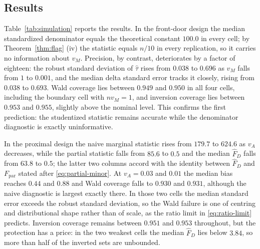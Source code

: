 \documentclass[12pt,a4paper]{article}
\theoremstyle{plain}
\theoremstyle{definition}
\newcommand{\FD}{\widehat{F}_D}
\begin{document}
\subsection{Results}

Table~\ref{tab:simulation} reports the results.
In the front-door design the median standardized denominator equals the theoretical constant $100.0$ in every cell;
by Theorem~\ref{thm:flag} (iv) the statistic equals $n/10$ in every replication, so it carries no information about $v_M$.
Precision, by contrast, deteriorates by a factor of eighteen:
the robust standard deviation of $\hat\tau$ rises from $0.038$ to $0.696$ as $v_M$ falls from $1$ to $0.001$, and the median delta standard error tracks it closely, rising from $0.038$ to $0.693$.
Wald coverage lies between $0.949$ and $0.950$ in all four cells, including the boundary cell with $nv_M=1$, and inversion coverage lies between $0.953$ and $0.955$, slightly above the nominal level.
This confirms the first prediction:
the studentized statistic remains accurate while the denominator diagnostic is exactly uninformative.

In the proximal design the naive marginal statistic rises from $179.7$ to $624.6$ as $v_A$ decreases, while the partial statistic falls from $85.6$ to $0.5$ and the median $\FD$ falls from $63.8$ to $0.5$;
the latter two columns accord with the identity between $\FD$ and $F_{\mathrm{par}}$ stated after \eqref{eq:partial-minor}.
At $v_A=0.03$ and $0.01$ the median bias reaches $0.44$ and $0.88$ and Wald coverage falls to $0.930$ and $0.931$, although the naive diagnostic is largest exactly there.
In those two cells the median standard error exceeds the robust standard deviation, so the Wald failure is one of centring and distributional shape rather than of scale, as the ratio limit in \eqref{eq:ratio-limit} predicts.
Inversion coverage remains between $0.951$ and $0.953$ throughout, but the protection has a price:
in the two weakest cells the median $\FD$ lies below $3.84$, so more than half of the inverted sets are unbounded.
\end{document}
